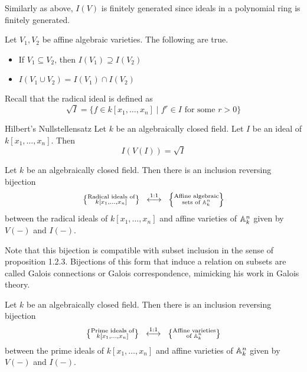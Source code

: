 \documentclass[a4paper]{article}
\begin{document}
Similarly as above, $I(V)$ is finitely generated since ideals in a polynomial ring is finitely generated. 

\begin{prp}{}{} Let $V_1,V_2$ be affine algebraic varieties. The following are true. 
\begin{itemize}
\item If $V_1\subseteq V_2$, then $I(V_1)\supseteq I(V_2)$
\item $I(V_1\cup V_2)=I(V_1)\cap I(V_2)$
\end{itemize}
\end{prp}

Recall that the radical ideal is defined as $$\sqrt{I}=\{f\in k[x_1,\dots,x_n]\;|\;f^r\in I\text{ for some }r>0\}$$

\begin{thm}{Hilbert's Nullstellensatz}{} Let $k$ be an algebraically closed field. Let $I$ be an ideal of $k[x_1,\dots,x_n]$. Then $$I(V(I))=\sqrt{I}$$
\end{thm}

\begin{crl}{}{} Let $k$ be an algebraically closed field. Then there is an inclusion reversing bijection $$\left\{\substack{\text{Radical ideals of}\\ k[x_1,\dots,x_n]}\right\}\;\;\overset{\text{1:1}}{\longleftrightarrow}\;\;\left\{\substack{\text{Affine algebraic}\\\text{sets of }\mathbb{A}_k^n}\right\}$$ between the radical ideals of $k[x_1,\dots,x_n]$ and affine varieties of $\mathbb{A}_k^n$ given by $V(-)$ and $I(-)$. 
\end{crl}

Note that this bijection is compatible with subset inclusion in the sense of proposition 1.2.3. Bijections of this form that induce a relation on subsets are called Galois connections or Galois correspondence, mimicking his work in Galois theory. 

\begin{crl}{}{} Let $k$ be an algebraically closed field. Then there is an inclusion reversing bijection $$\left\{\substack{\text{Prime ideals of}\\ k[x_1,\dots,x_n]}\right\}\;\;\overset{\text{1:1}}{\longleftrightarrow}\;\;\left\{\substack{\text{Affine varieties}\\\text{of }\mathbb{A}_k^n}\right\}$$ between the prime ideals of $k[x_1,\dots,x_n]$ and affine varieties of $\mathbb{A}_k^n$ given by $V(-)$ and $I(-)$. 
\end{crl}
\end{document}
